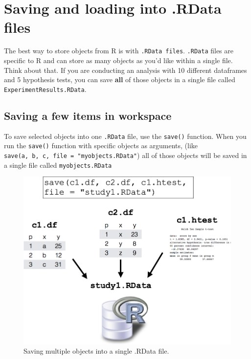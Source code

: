 \documentclass[
]{book}
\begin{document}
\hypertarget{saving-and-loading-into-.rdata-files}{%
\section{Saving and loading into .RData files}\label{saving-and-loading-into-.rdata-files}}

The best way to store objects from R is with \texttt{.RData\ files}. \texttt{.RData} files are specific to R and can store as many objects as you'd like within a single file. Think about that. If you are conducting an analysis with 10 different dataframes and 5 hypothesis tests, you can save \textbf{all} of those objects in a single file called \texttt{ExperimentResults.RData}.

\hypertarget{saving-a-few-items-in-workspace}{%
\subsection{Saving a few items in workspace}\label{saving-a-few-items-in-workspace}}

To save selected objects into one \texttt{.RData} file, use the \texttt{save()} function. When you run the \texttt{save()} function with specific objects as arguments, (like \texttt{save(a,\ b,\ c,\ file\ =\ "myobjects.RData"}) all of those objects will be saved in a single file called \texttt{myobjects.RData}

\begin{figure}

{\centering \includegraphics[width=0.75\linewidth]{images/rdata_example} 

}

\caption{Saving multiple objects into a single .RData file.}\label{fig:rdata}
\end{figure}
\end{document}
